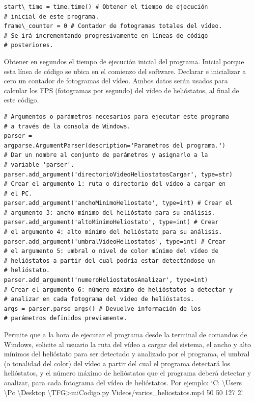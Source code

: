 \begin{lstlisting}
start\_time = time.time() # Obtener el tiempo de ejecución
# inicial de este programa.
frame\_counter = 0 # Contador de fotogramas totales del vídeo.
# Se irá incrementando progresivamente en líneas de código
# posteriores.
\end{lstlisting}

Obtener en segundos el tiempo de ejecución inicial del programa. Inicial porque esta línea de código se ubica en el comienzo del software. Declarar e inicializar a cero un contador de fotogramas del vídeo. Ambos datos serán usados para calcular los FPS (fotogramas por segundo) del vídeo de helióstatos, al final de este código.\\[20pt]

\begin{lstlisting}
# Argumentos o parámetros necesarios para ejecutar este programa
# a través de la consola de Windows.
parser = 
argparse.ArgumentParser(description='Parametros del programa.')
# Dar un nombre al conjunto de parámetros y asignarlo a la
# variable 'parser'.
parser.add_argument('directorioVideoHeliostatosCargar', type=str)
# Crear el argumento 1: ruta o directorio del vídeo a cargar en
# el PC.
parser.add_argument('anchoMinimoHeliostato', type=int) # Crear el 
# argumento 3: ancho mínimo del helióstato para su análisis.
parser.add_argument('altoMinimoHeliostato', type=int) # Crear
# el argumento 4: alto mínimo del helióstato para su análisis.
parser.add_argument('umbralVideoHeliostatos', type=int) # Crear
# el argumento 5: umbral o nivel de color mínimo del vídeo de
# helióstatos a partir del cual podría estar detectándose un
# helióstato.
parser.add_argument('numeroHeliostatosAnalizar', type=int)
# Crear el argumento 6: número máximo de helióstatos a detectar y
# analizar en cada fotograma del vídeo de helióstatos.
args = parser.parse_args() # Devuelve información de los
# parámetros definidos previamente.
\end{lstlisting}

Permite que a la hora de ejecutar el programa desde la terminal de comandos de Windows, solicite al usuario la ruta del vídeo a cargar del sistema, el ancho y alto mínimos del helióstato para ser detectado y analizado por el programa, el umbral (o tonalidad del color) del vídeo a partir del cual el programa detectará los helióstatos, y el número máximo de helióstatos que el programa deberá detectar y analizar, para cada fotograma del vídeo de helióstatos. Por ejemplo: ‘C: \textbackslash Users \textbackslash Pc \textbackslash Desktop \textbackslash TFG>miCodigo.py Videos/varios\_heliostatos.mp4 50 50 127 2’.

